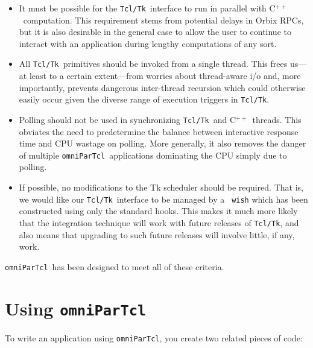 \documentclass[11pt]{article}
\def\omniParTcl{{\tt omniParTcl}}
\def\tcltk{{\tt Tcl/Tk}}
\def\CXX{\relax C$^{++}$\relax}
\begin{document}
\begin{itemize}

\item 
It must be possible for the \tcltk\ interface to run in parallel with
\CXX\ computation.  This requirement stems from potential delays in
Orbix RPCs, but it is also desirable in the general case to allow
the user to continue to interact with an application during
lengthy computations of any sort.

\item
All \tcltk\ primitives should be invoked from a single thread.  This
frees us---at least to a certain extent---from worries about
thread-aware i/o and, more importantly, prevents dangerous inter-thread
recursion which could otherwise easily occur given the diverse range of
execution triggers in \tcltk.

\item
Polling should not be used in synchronizing \tcltk\ and \CXX\
threads.  This obviates the need to predetermine the balance between
interactive response time and CPU wastage on polling.  More generally,
it also removes the danger of multiple \omniParTcl\ applications
dominating the CPU simply due to polling.

\item 
If possible, no modifications to the Tk scheduler should be required.
That is, we would like our \tcltk\ interface to be managed by a {\tt
wish} which has been constructed using only the standard
hooks.  This makes it much more likely that the integration technique
will work with future releases of \tcltk, and also means that upgrading
to such future releases will involve little, if any, work.

\end{itemize}

\noindent
\omniParTcl\ has been designed to meet all of these criteria.

\section{Using \omniParTcl}

To write an application using \omniParTcl, you create two related pieces
of code:
\end{document}
